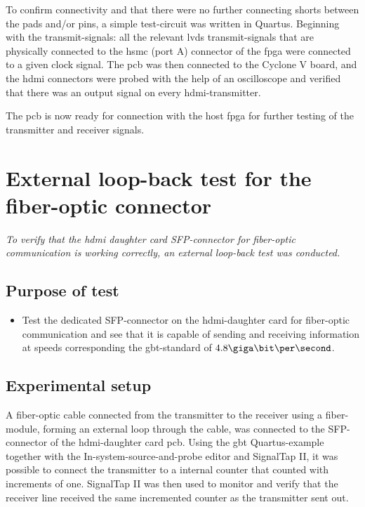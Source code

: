 \documentclass[main.tex]{subfiles}
\begin{document}
To confirm connectivity and that there were no further connecting shorts between the pads and/or pins, a simple test-circuit was written in Quartus. Beginning with the transmit-signals: all the relevant \gls{lvds} transmit-signals that are physically connected to the \gls{hsmc} (port A) connector of the \gls{fpga} were connected to a given clock signal. The \gls{pcb} was then connected to the Cyclone V board, and the \gls{hdmi} connectors were probed with the help of an oscilloscope and verified that there was an output signal on every \gls{hdmi}-transmitter. 

The \gls{pcb} is now ready for connection with the host \gls{fpga} for further testing of the transmitter and receiver signals. 

\section{External loop-back test for the fiber-optic connector}

\textit{To verify that the \gls{hdmi} daughter card SFP-connector for fiber-optic communication is working correctly, an external loop-back test was conducted.}

\subsection{Purpose of test}
\begin{itemize}\setlength{\itemsep}{10pt}

\item Test the dedicated SFP-connector on the \gls{hdmi}-daughter card for fiber-optic communication and see that it is capable of sending and receiving information at speeds corresponding the \gls{gbt}-standard of $4.8 \giga\bit\per\second$. 
\end{itemize}

\subsection{Experimental setup}
A fiber-optic cable connected from the transmitter to the receiver using a fiber-module, forming an external loop through the cable, was connected to the SFP-connector of the \gls{hdmi}-daughter card \gls{pcb}. Using the \gls{gbt} Quartus-example together with the In-system-source-and-probe editor and SignalTap II, it was possible to connect the transmitter to a internal counter that counted with increments of one. SignalTap II was then used to monitor and verify that the receiver line received the same incremented counter as the transmitter sent out.
\end{document}
